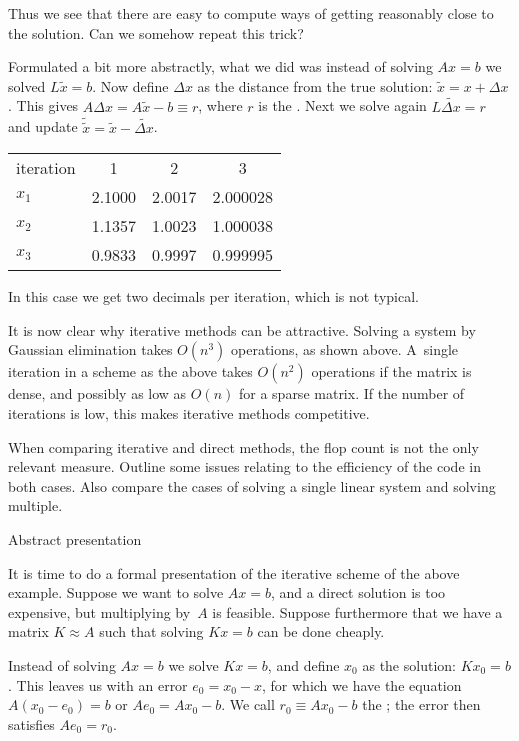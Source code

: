 Thus we see that there are easy to compute ways of getting
reasonably close to the solution. Can we somehow repeat this trick?

Formulated a bit more abstractly, what we did was instead of solving
$Ax=b$ we solved $L\tilde x=b$. Now define $\Delta x$ as the distance
from the true solution: $\tilde x=x+\Delta x$. This gives $A\Delta
x=A\tilde x-b\equiv r$, where $r$ is the . Next
we solve again $L\widetilde{\Delta x}=r$ and update $\tilde{\tilde
  x}=\tilde x-\widetilde{\Delta x}$.

  \begin{tabular}{lccc}
    \toprule
    iteration&1&2&3\\
    $x_1$&2.1000&2.0017&2.000028\\
    $x_2$&1.1357&1.0023&1.000038\\
    $x_3$&0.9833&0.9997&0.999995\\ \bottomrule
  \end{tabular}

In this case we get two decimals per iteration, which is not typical.

It is now clear why iterative methods can be attractive. 
Solving a system by Gaussian elimination takes $O(n^3)$ operations, as
shown above. A~single iteration in a scheme as the above takes
$O(n^2)$ operations if the matrix is dense, and possibly as low as
$O(n)$ for a sparse matrix. If the number of iterations is low, this makes
iterative methods competitive.

\begin{exercise}
  When comparing iterative and direct methods, the flop count is not
  the only relevant measure. Outline some issues relating to the
  efficiency of the code in both cases. Also compare the cases of
  solving a single linear system and solving multiple.
\end{exercise}

 {Abstract presentation}
\label{sec:stationary}

It is time to do a formal presentation of the iterative scheme of the
above example. Suppose we want to solve $Ax=b$, and a direct solution
is too expensive, but multiplying by~$A$ is feasible. Suppose
furthermore that we have a matrix $K\approx A$ such that solving $Kx=b$
can be done cheaply.

Instead of solving $Ax=b$ we solve $Kx=b$, and define $x_0$ as the
solution: $Kx_0=b$. This leaves us with an error $e_0=x_0-x$, for
which we have the equation $A(x_0-e_0)=b$ or $Ae_0=Ax_0-b$. We call
$r_0\equiv Ax_0-b$ the ; the error then satisfies
$Ae_0=r_0$.

